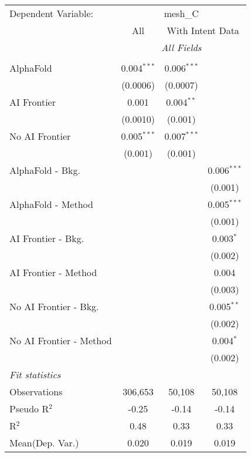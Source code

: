 \begingroup
\centering
\begin{tabular}{lccc}
   \tabularnewline \midrule \midrule
   Dependent Variable: & \multicolumn{3}{c}{mesh\_C}\\
 & \multicolumn{1}{c}{All} & \multicolumn{2}{c}{With Intent Data} \\
\cmidrule(lr){2-2} \cmidrule(lr){3-4}
 & \multicolumn{3}{c}{\textit{All Fields}} \\ \\
   AlphaFold               & 0.004$^{***}$ & 0.006$^{***}$ &   \\   
                           & (0.0006)      & (0.0007)      &   \\   
   AI Frontier             & 0.001         & 0.004$^{**}$  &   \\   
                           & (0.0010)      & (0.001)       &   \\   
   No AI Frontier          & 0.005$^{***}$ & 0.007$^{***}$ &   \\   
                           & (0.001)       & (0.001)       &   \\   
   AlphaFold - Bkg.        &               &               & 0.006$^{***}$\\   
                           &               &               & (0.001)\\   
   AlphaFold - Method      &               &               & 0.005$^{***}$\\   
                           &               &               & (0.001)\\   
   AI Frontier - Bkg.      &               &               & 0.003$^{*}$\\   
                           &               &               & (0.002)\\   
   AI Frontier - Method    &               &               & 0.004\\   
                           &               &               & (0.003)\\   
   No AI Frontier - Bkg.   &               &               & 0.005$^{**}$\\   
                           &               &               & (0.002)\\   
   No AI Frontier - Method &               &               & 0.004$^{*}$\\   
                           &               &               & (0.002)\\   
   \midrule
   \emph{Fit statistics}\\
   Observations            & 306,653       & 50,108        & 50,108\\  
   Pseudo R$^2$            & -0.25         & -0.14         & -0.14\\  
   R$^2$                   & 0.48          & 0.33          & 0.33\\  
Mean(Dep. Var.) & 0.020 & 0.019 & 0.019 \\
   

\end{tabular}

